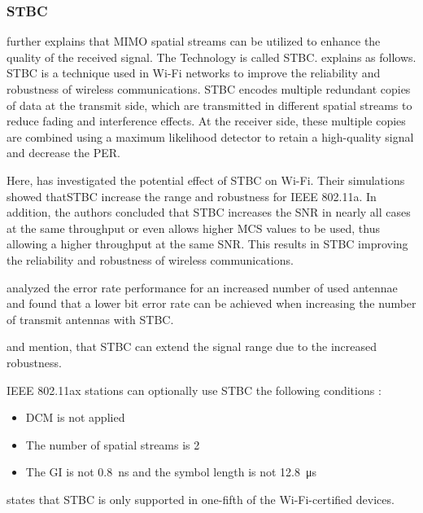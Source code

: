 \subsubsection*{\acf{STBC}}
\textcite{abbas_efficient_2016} further explains that \ac{MIMO} spatial streams can be utilized to enhance the
quality of the received signal.
The Technology is called \ac{STBC}.
\textcite{santumon_space-time_2012} explains as follows.
\ac{STBC} is a technique used in Wi-Fi networks to improve the reliability and robustness of wireless communications.
\ac{STBC} encodes multiple redundant copies of data at the transmit side, which are transmitted in different spatial streams to
reduce fading and interference effects.
At the receiver side, these multiple copies are combined using a maximum likelihood detector
to retain a high-quality signal and decrease the \ac{PER}.


Here, \textcite{stamoulis_impact_2003} has investigated the potential effect of \ac{STBC} on Wi-Fi.
Their simulations showed that\ac{STBC} increase the range and robustness for IEEE 802.11a.
In addition, the authors concluded that \ac{STBC} increases the \ac{SNR} in nearly all cases at the same throughput or
even allows higher \ac{MCS} values to be used,
thus allowing a higher throughput at the same \ac{SNR}.
This results in \ac{STBC} improving the reliability and robustness of wireless communications.

\textcite{ghosh_error_2014} analyzed the error rate performance for an increased number of used antennae and found
that a lower bit error rate can be achieved
when increasing the number of transmit antennas with \ac{STBC}.

\textcite{gast_80211n_nodate} and \textcite{sauter_wireless_2022} mention, that \ac{STBC} can extend the signal range
due to the increased robustness.


IEEE 802.11ax stations can optionally use \ac{STBC} the following conditions \cite{noauthor_ieee_2021}:
\begin{itemize}
	\item DCM is not applied
	\item The number of spatial streams is \num{2}
	\item The \ac{GI} is not \SI{0.8}{\nano\second} and the symbol length is not \SI{12.8}{\micro\second}
\end{itemize}

\cite{gast_80211n_nodate} states that \ac{STBC} is only supported in one-fifth of the Wi-Fi-certified devices.

